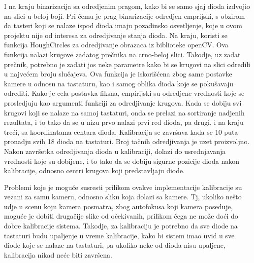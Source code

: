 \documentclass[a4paper,12pt, projekat]{etf}
\begin{document}
        I na kraju binarizacija sa odredjenim pragom, kako bi
        se samo sjaj dioda izdvojio na slici u beloj boji. Pri \v{c}emu je prag
        binarizacije odredjen emprijski, s obzirom da tasteri koji se nalaze
        ispod dioda imaju pozadinsko osvetljenje, koje u ovom projektu nije od
        interesa za odredjivanje stanja dioda. Na kraju, koristi se funkcija
        HoughCircles za odredjivanje obrazaca iz biblioteke openCV\@. Ova
        funkcija nalazi krugove zadatog pre\v{c}nika na crno-beloj slici. Takodje,
        uz zadat pre\v{c}nik, potrebno je zadati jos neke parametre kako bi se
        krugovi na slici odredili u najve\'{c}em broju slu\v{c}ajeva. Ova funkcija je
        iskori\v{s}\'{c}ena zbog same postavke kamere u odnosu na tastaturu, kao i
        samog oblika dioda koje se poku\v{s}avaju odrediti. Kako je cela postavka
        fiksna, empirijski su odredjene vrednosti koje se prosledjuju kao
        argumenti funkciji za odredjivanje krugova. Kada se dobiju svi krugovi
        koji se nalaze na samoj tastaturi, onda se prelazi na sortiranje
        nadjenih rezultata, i to tako da se u nizu prvo nalazi prvi red dioda,
        pa drugi, i na kraju tre\'{c}i, sa koordinatama centara dioda. Kalibracija
        se zavr\v{s}ava kada se 10 puta pronadju svih 18 dioda na tastaturi. Broj
        ta\v{c}nih odredjivanja je uzet proizvoljno. Nakon zavr\v{s}etka odredjivanja
        dioda u kalibraciji, dolazi do usrednjavanja vrednosti koje su
        dobijene, i to tako da se dobiju sigurne pozicije dioda nakon
        kalibracije, odnosno centri krugova koji predstavljaju diode.

        Problemi koje je mogu\'{c}e susresti prilikom ovakve implementacije
        kalibracije su vezani za samu kameru, odnosno sliku koja dolazi sa
        kamere. Tj, ukoliko ne\v{s}to udje u scenu koju kamera posmatra, zbog
        autofokusa koji kamera poseduje, mogu\'{c}e je dobiti druga\v{c}ije
        slike od o\v{c}ekivanih, prilikom \v{c}ega ne mo\v{z}e do\'{c}i do
        dobre kalibracije sistema. Takodje, za kalibraciju je potrebno da sve
        diode na tastaturi budu upaljenje u vreme kalibracije, kako bi sistem
        imao uvid u sve diode koje se nalaze na tastaturi, pa ukoliko neke od
        dioda nisu upaljene, kalibracija nikad ne\'{c}e biti zavr\v{s}ena.
\end{document}
